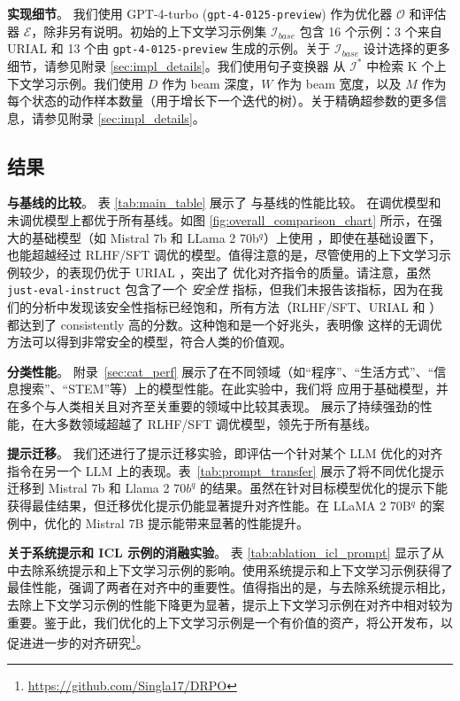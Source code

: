 \noindent \textbf{实现细节}。
我们使用 GPT-4-turbo (\texttt{gpt-4-0125-preview}) 作为优化器 $\mathcal{O}$ 和评估器 $\mathcal{E}$，除非另有说明。初始的上下文学习示例集 $\mathcal{I}_{base}$ 包含 16 个示例：3 个来自 URIAL \cite{Lin2024ReAlign} 和 13 个由 \texttt{gpt-4-0125-preview} 生成的示例。关于 $\mathcal{I}_{base}$ 设计选择的更多细节，请参见附录 \ref{sec:impl_details}。我们使用句子变换器 \cite{reimers-2019-sentence-bert} 从 $\mathcal{I}^*$ 中检索 K 个上下文学习示例。我们使用 $D$ 作为 beam 深度，$W$ 作为 beam 宽度，以及 $M$ 作为每个状态的动作样本数量（用于增长下一个迭代的树）。关于精确超参数的更多信息，请参见附录 \ref{sec:impl_details}。
\subsection{结果}

\noindent \textbf{与基线的比较}。
表 \ref{tab:main_table} 展示了 \ours 与基线的性能比较。 \ours 在调优模型和未调优模型上都优于所有基线。如图 \ref{fig:overall_comparison_chart} 所示，在强大的基础模型（如 Mistral 7b 和 LLama 2 70b$^q$）上使用 \ours，即使在基础设置下，也能超越经过 RLHF/SFT 调优的模型。值得注意的是，尽管使用的上下文学习示例较少，\ours 的表现仍优于 URIAL \citep{Lin2024ReAlign}，突出了 \ours 优化对齐指令的质量。请注意，虽然 \texttt{just-eval-instruct} 包含了一个 \textit{安全性} 指标，但我们未报告该指标，因为在我们的分析中发现该安全性指标已经饱和，所有方法（RLHF/SFT、URIAL 和 \ours）都达到了 consistently 高的分数。这种饱和是一个好兆头，表明像 \ours 这样的无调优方法可以得到非常安全的模型，符合人类的价值观。

\noindent \textbf{分类性能}。
附录~\ref{sec:cat_perf} 展示了在不同领域（如“程序”、“生活方式”、“信息搜索”、“STEM”等）上的模型性能。在此实验中，我们将 \ours 应用于基础模型，并在多个与人类相关且对齐至关重要的领域中比较其表现。 \ours 展示了持续强劲的性能，在大多数领域超越了 RLHF/SFT 调优模型，领先于所有基线。


\noindent \textbf{提示迁移}。
我们还进行了提示迁移实验，即评估一个针对某个 LLM 优化的对齐指令在另一个 LLM 上的表现。表~\ref{tab:prompt_transfer} 展示了将不同优化提示迁移到 Mistral 7b 和 Llama 2 70$b^q$ 的结果。虽然在针对目标模型优化的提示下能获得最佳结果，但迁移优化提示仍能显著提升对齐性能。在 LLaMA 2 70B$^q$ 的案例中，优化的 Mistral 7B 提示能带来显著的性能提升。

\noindent \textbf{关于系统提示和 ICL 示例的消融实验}。
表 \ref{tab:ablation_icl_prompt} 显示了从 \ours 中去除系统提示和上下文学习示例的影响。使用系统提示和上下文学习示例获得了最佳性能，强调了两者在对齐中的重要性。值得指出的是，与去除系统提示相比，去除上下文学习示例的性能下降更为显著，提示上下文学习示例在对齐中相对较为重要。鉴于此，我们优化的上下文学习示例是一个有价值的资产，将公开发布，以促进进一步的对齐研究\footnote{\url{https://github.com/Singla17/DRPO}}。

